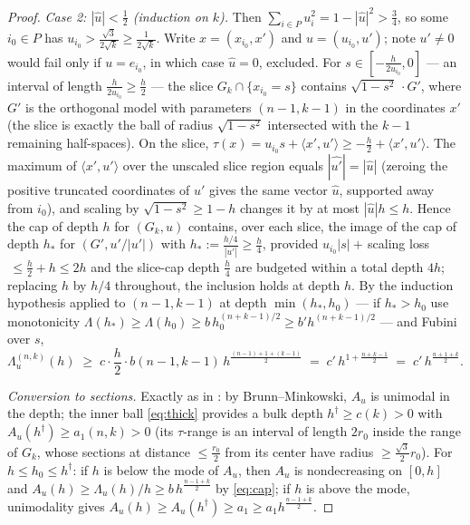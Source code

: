 ﻿\documentclass[11pt]{article}
\begin{document}
\begin{proof}
\emph{Case 2: $|\hat u|<\frac12$ (induction on $k$).}  Then
$\sum_{i\in P}u_i^2=1-|\hat u|^2>\frac34$, so some $i_0\in P$ has
$u_{i_0}>\frac{\sqrt3}{2\sqrt k}\ge\frac1{2\sqrt k}$.  Write
$x=(x_{i_0},x')$ and $u=(u_{i_0},u')$; note $u'\ne0$ would fail only if
$u=e_{i_0}$, in which case $\hat u=0$, excluded.  For
$s\in[-\frac{h}{2u_{i_0}},0]$ --- an interval of length
$\frac h{2u_{i_0}}\ge\frac h2$ --- the slice
$G_k\cap\{x_{i_0}=s\}$ contains $\sqrt{1-s^2}\,\cdot G'$, where
$G'$ is the orthogonal model with parameters $(n-1,k-1)$ in the coordinates
$x'$ {\rm(}the slice is exactly the ball of radius $\sqrt{1-s^2}$
intersected with the $k-1$ remaining half-spaces{\rm)}.  On the slice,
$\tau(x)=u_{i_0}s+\langle x',u'\rangle\ge-\frac h2+\langle x',u'\rangle$.
The maximum of $\langle x',u'\rangle$ over the unscaled slice region equals
$|\widehat{u'}|=|\hat u|$ {\rm(}zeroing the positive truncated coordinates of
$u'$ gives the same vector $\hat u$, supported away from
$i_0${\rm)}, and scaling by $\sqrt{1-s^2}\ge1-h$ changes it by at most
$|\hat u|h\le h$.  Hence the cap of depth $h$ for $(G_k,u)$ contains, over
each slice, the image of the cap of depth $h_*$ for
$(G',u'/|u'|)$ with
$h_*:=\frac{h/4}{|u'|}\ge\frac h4$, provided
$u_{i_0}|s|+\,$scaling loss$\,\le\frac h2+h\le2h$ and the slice-cap depth
$\frac h4$ are budgeted within a total depth $4h$; replacing $h$ by
$h/4$ throughout, the inclusion holds at depth $h$.  By the induction
hypothesis applied to $(n-1,k-1)$ at depth $\min(h_*,h_0)$ --- if
$h_*>h_0$ use monotonicity $\Lambda(h_*)\ge\Lambda(h_0)\ge b\,h_0^{(n+k-1)/2}
\ge b'h^{(n+k-1)/2}$ --- and Fubini over $s$,
\[
\Lambda^{(n,k)}_u(h)\;\ge\;c\cdot\frac h2\cdot
b(n-1,k-1)\,h^{\frac{(n-1)+1+(k-1)}2}
\;=\;c'\,h^{1+\frac{n+k-1}2}\;=\;c'\,h^{\frac{n+1+k}2}.
\]

\emph{Conversion to sections.}  Exactly as in \cite{companion7}: by
Brunn--Minkowski, $A_u$ is unimodal in the depth; the inner ball
\eqref{eq:thick} provides a bulk depth
$h^\dagger\ge c(k)>0$ with $A_u(h^\dagger)\ge a_1(n,k)>0$ {\rm(}its
$\tau$-range is an interval of length $2r_0$ inside the range of $G_k$,
whose sections at distance $\le\frac{r_0}2$ from its center have radius
$\ge\frac{\sqrt3}2r_0${\rm)}.  For $h\le h_0\le h^\dagger$: if $h$ is below
the mode of $A_u$, then $A_u$ is nondecreasing on $[0,h]$ and
$A_u(h)\ge\Lambda_u(h)/h\ge b\,h^{\frac{n-1+k}2}$ by \eqref{eq:cap}; if $h$
is above the mode, unimodality gives
$A_u(h)\ge A_u(h^\dagger)\ge a_1\ge a_1h^{\frac{n-1+k}2}$.
\end{proof}
\end{document}
